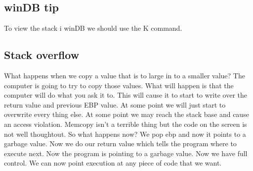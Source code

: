 \documentclass[letterpaper, onecolumn,10pt]{IEEEtran}
\begin{document}
		   
		   \subsection{winDB tip}
		   To view the stack i winDB we should use the K command.
		   
		   \subsection{Stack overflow}
		   What happens when we copy a value that is to large in to a smaller value? The computer is going to try to copy those values. What will happen is that the computer will do what you ask it to. This will cause it to start to write over the return value and previous EBP value. At some point we will just start to overwrite every thing else. At some point we may reach the stack base and cause an access violation. Memcopy isn't a terrible thing but the code on the screen is not well thoughtout. So what happens now? We pop ebp and now it points to a garbage value. Now we do our return value which tells the program where to execute next. Now the program is pointing to a garbage value. Now we have full control. We can now point execution at any piece of code that we want.\\
		   
\end{document}
